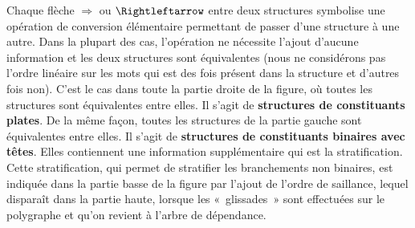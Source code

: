 Chaque flèche $\Rightarrow$ ou $\Rightleftarrow$ entre deux structures symbolise une opération de conversion élémentaire permettant de passer d’une structure à une autre. Dans la plupart des cas, l’opération ne nécessite l’ajout d’aucune information et les deux structures sont équivalentes (nous ne considérons pas l’ordre linéaire sur les mots qui est des fois présent dans la structure et d’autres fois non). C’est le cas dans toute la partie droite de la figure, où toutes les structures sont équivalentes entre elles. Il s'agit de \textbf{structures de constituants plates}. De la même façon, toutes les structures de la partie gauche sont équivalentes entre elles. Il s'agit de \textbf{structures de constituants binaires avec têtes}. Elles contiennent une information supplémentaire qui est la stratification. Cette stratification, qui permet de stratifier les branchements non binaires, est indiquée dans la partie basse de la figure par l’ajout de l’ordre de saillance, lequel disparaît dans la partie haute, lorsque les «~glissades~» sont effectuées sur le polygraphe et qu’on revient à l’arbre de dépendance.

